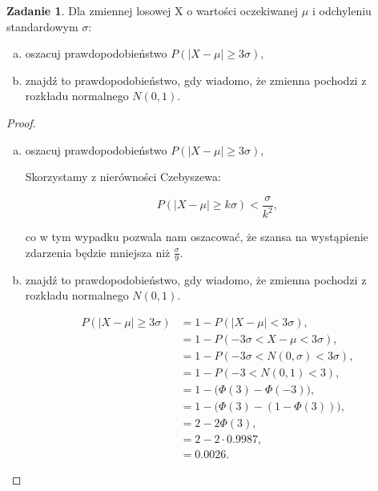 \documentclass[11pt]{article}
\theoremstyle{definition}
\newtheorem{zadanie}{Zadanie}
\begin{document}
\begin{zadanie}
    Dla zmiennej losowej X o wartości oczekiwanej $\mu$ i odchyleniu standardowym $\sigma$:

    \begin{enumerate}[a)]
        \item oszacuj prawdopodobieństwo $P(|X - \mu| \geq 3\sigma)$,
        \item znajdź to prawdopodobieństwo, gdy wiadomo, że zmienna pochodzi z rozkładu normalnego $N(0, 1)$.
    \end{enumerate}
\end{zadanie}
\begin{proof}

    \begin{enumerate}[a)]
        \item oszacuj prawdopodobieństwo $P(|X - \mu| \geq 3\sigma)$,

              Skorzystamy z nierówności Czebyszewa:

              $$P(|X-\mu| \geq k\sigma) < \frac\sigma{k^2},$$

              co w tym wypadku pozwala nam oszacować, że szansa na wystąpienie zdarzenia będzie mniejsza niż $\frac\sigma9$.

        \item znajdź to prawdopodobieństwo, gdy wiadomo, że zmienna pochodzi z rozkładu normalnego $N(0, 1)$.

              \begin{align*}
                  P(|X - \mu| \geq 3\sigma) & =       1 - P(|X-\mu|<3\sigma),              \\
                                            & =       1 - P(-3\sigma<X-\mu<3\sigma),       \\
                                            & =       1 - P(-3\sigma<N(0,\sigma)<3\sigma), \\
                                            & =       1 - P(-3<N(0,1)<3),                  \\
                                            & =       1 - \Bigg(\Phi(3)-\Phi(-3)\Bigg),    \\
                                            & =       1 - \Bigg(\Phi(3)-(1-\Phi(3))\Bigg), \\
                                            & =       2 - 2\Phi(3),                        \\
                                            & =       2- 2\cdot0.9987,                     \\
                                            & =       0.0026.
              \end{align*}
    \end{enumerate}
\end{proof}
\end{document}
